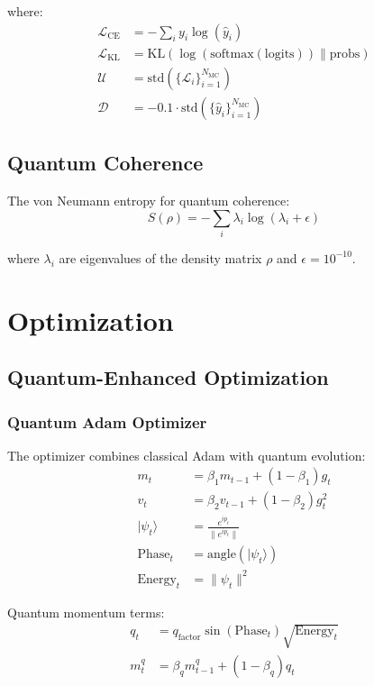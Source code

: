 \documentclass{article}
\begin{document}
where:
\begin{align*}
\mathcal{L}_{\text{CE}} &= -\sum_{i} y_i \log(\hat{y}_i) \\
\mathcal{L}_{\text{KL}} &= \text{KL}(\log(\text{softmax}(\text{logits})) \| \text{probs}) \\
\mathcal{U} &= \text{std}(\{\mathcal{L}_i\}_{i=1}^{N_{\text{MC}}}) \\
\mathcal{D} &= -0.1 \cdot \text{std}(\{\hat{y}_i\}_{i=1}^{N_{\text{MC}}})
\end{align*}

\subsection{Quantum Coherence}
The von Neumann entropy for quantum coherence:
\begin{equation}
S(\rho) = -\sum_i \lambda_i \log(\lambda_i + \epsilon)
\end{equation}

where $\lambda_i$ are eigenvalues of the density matrix $\rho$ and $\epsilon=10^{-10}$.

\section{Optimization}

\subsection{Quantum-Enhanced Optimization}

\subsubsection{Quantum Adam Optimizer}
The optimizer combines classical Adam with quantum evolution:
\begin{align*}
m_t &= \beta_1 m_{t-1} + (1-\beta_1)g_t \\
v_t &= \beta_2 v_{t-1} + (1-\beta_2)g_t^2 \\
|\psi_t\rangle &= \frac{e^{i p_t}}{\|e^{i p_t}\|} \\
\text{Phase}_t &= \text{angle}(|\psi_t\rangle) \\
\text{Energy}_t &= \|\psi_t\|^2
\end{align*}

Quantum momentum terms:
\begin{align*}
q_t &= q_{\text{factor}} \sin(\text{Phase}_t) \sqrt{\text{Energy}_t} \\
m^q_t &= \beta_q m^q_{t-1} + (1-\beta_q)q_t
\end{align*}
\end{document}
